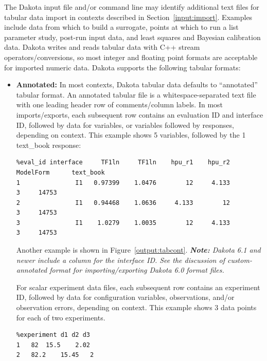 The Dakota input file and/or command line may identify additional text
files for tabular data import in contexts described in
Section~\ref{input:import}.  Examples include data from which to build
a surrogate, points at which to run a list parameter study, post-run
input data, and least squares and Bayesian calibration data. Dakota
writes and reads tabular data with C++ stream operators/conversions,
so most integer and floating point formats are acceptable for imported
numeric data.  Dakota supports the following tabular formats:
\begin{itemize}

\item \textbf{Annotated:} In most contexts, Dakota tabular data
  defaults to ``annotated'' tabular format.  An annotated tabular file
  is a whitespace-separated text file with one leading header row of
  comments/column labels.  In most imports/exports, each subsequent
  row contains an evaluation ID and interface ID, followed by data for
  variables, or variables followed by responses, depending on context.
  This example shows 5 variables, followed by the 1 text\_book
  response:
\begin{footnotesize}
\begin{verbatim}
%eval_id interface     TF1ln     TF1ln    hpu_r1    hpu_r2 ModelForm      text_book 
1               I1   0.97399    1.0476        12     4.133         3     14753 
2               I1   0.94468    1.0636     4.133        12         3     14753 
3               I1    1.0279    1.0035        12     4.133         3     14753  
\end{verbatim}
\end{footnotesize}
Another example is shown in Figure~\ref{output:tabcont}. \emph{{\bf
    Note:} Dakota 6.1 and newer include a column for the interface ID.
  See the discussion of custom-annotated format for
  importing/exporting Dakota 6.0 format files.}

  For scalar experiment data files, each subsequent row contains an
  experiment ID, followed by data for configuration variables,
  observations, and/or observation errors, depending on context.  This
  example shows 3 data points for each of two experiments.
\begin{verbatim}
%experiment d1 d2 d3
1	82	15.5	2.02
2	82.2	15.45	2
\end{verbatim}


\end{itemize}
